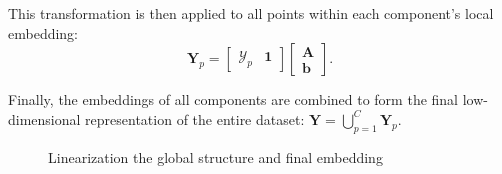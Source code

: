         This transformation is then applied to all points within each component's local embedding:
        \begin{equation}
            \boldsymbol{Y}_p = \begin{bmatrix}
                \boldsymbol{\mathcal{Y}}_p  & \boldsymbol{1}
            \end{bmatrix} \begin{bmatrix}
                \boldsymbol{A} \\
                \boldsymbol{b}
            \end{bmatrix}.
        \end{equation}

        Finally, the embeddings of all components are combined to form the final low-dimensional representation of the entire dataset: $\boldsymbol{Y} = \bigcup_{p=1}^{C} \boldsymbol{Y}_p$.

        \begin{figure}[htbp]
            \centering
            \caption{Linearization the global structure and final embedding}
            \label{fig:inter-component_linearization}
        \end{figure}





        
